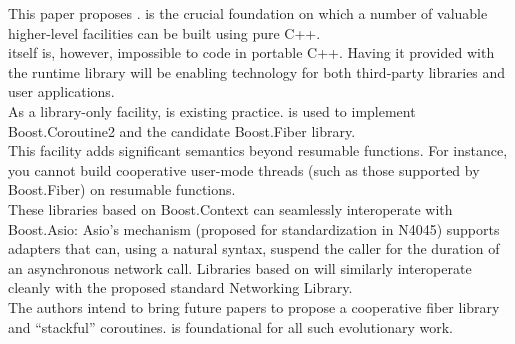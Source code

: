 This paper proposes .  is
the crucial foundation on which a number of valuable higher-level facilities
can be built using pure C++.\\
\newline
{} itself is, however, impossible to code in portable
C++. Having it provided with the runtime library will be enabling technology
for both third-party libraries and user applications.\\
\newline
As a library-only facility,
\cite{bcontext} is existing practice.
 is used to implement
Boost.Coroutine2\cite{bcoroutine2} and the candidate Boost.Fiber
library\cite{bfiber}.\\
\newline
This facility adds significant semantics beyond resumable functions. For
instance, you cannot build cooperative user-mode threads (such as those
supported by Boost.Fiber) on resumable functions.\\
\newline
These libraries based on Boost.Context can seamlessly interoperate with
Boost.Asio\cite{basio}: Asio's  mechanism (proposed for
standardization in N4045\cite{N4045}) supports adapters that can, using a
natural syntax, suspend the caller for the duration of an asynchronous network
call. Libraries based on  will similarly
interoperate cleanly with the proposed standard Networking Library\cite{N4478}.\\
\newline
The authors intend to bring future papers to propose a cooperative fiber
library and ``stackful'' coroutines.  is foundational
for all such evolutionary work.
